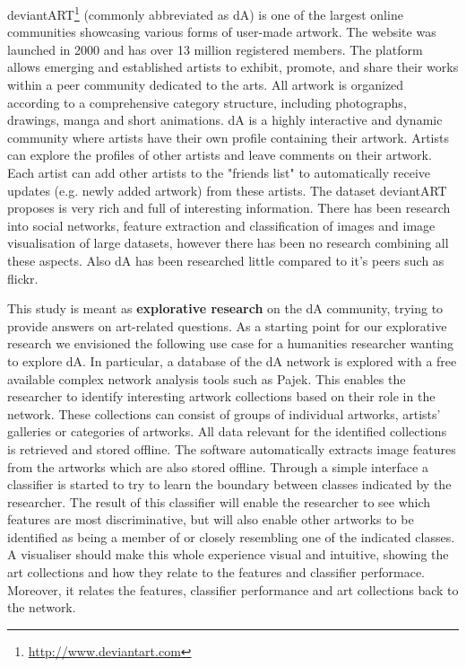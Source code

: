 deviantART\footnote{\url{http://www.deviantart.com}} (commonly abbreviated as dA) is one of the largest online communities showcasing various forms of user-made artwork.
The website was launched in 2000 and has over 13 million registered members.
The platform allows emerging and established artists to exhibit, promote, and share their works within a peer community dedicated to the arts. 
All artwork is organized according to a comprehensive category structure, including photographs, drawings, manga and short animations.
dA is a highly interactive and dynamic community where artists have their own profile containing their artwork.
Artists can explore the profiles of other artists and leave comments on their artwork.
Each artist can add other artists to the "friends list" to automatically receive updates (e.g. newly added artwork) from these artists.
The dataset deviantART proposes is very rich and full of interesting information. There has been research into social networks, feature extraction and classification of images and image visualisation of large datasets, however there has been no research combining all these aspects. Also dA has been researched little compared to it's peers such as flickr.

This study is meant as \textbf{explorative research} on the dA community, trying to provide answers on art-related questions.
As a starting point for our explorative research we envisioned the following use case for a humanities researcher wanting to explore dA. In particular, a database of the dA network is explored with a free available complex network analysis tools such as Pajek. This enables the researcher to identify interesting artwork collections based on their role in the network. These collections can consist of groups of individual artworks, artists' galleries or categories of artworks.  All data relevant for the identified collections is retrieved and stored offline. The software automatically extracts image features from the artworks which are also stored offline. Through a simple interface a classifier is started to try to learn the boundary between classes indicated by the researcher. The result of this classifier will enable the researcher to see which features are most discriminative, but will also enable other artworks to be identified as being a member of or closely resembling one of the indicated classes. A visualiser should make this whole experience visual and intuitive, showing the art collections and how they relate to the features and classifier performace. Moreover, it relates the features, classifier performance and art collections back to the network.

